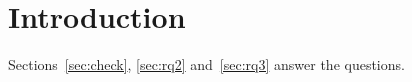 \documentclass[conference]{IEEEtran}
\begin{document}
\section{Introduction}
Sections~\ref{sec:check}, \ref{sec:rq2} and~\ref{sec:rq3} answer the questions.

\end{document}
